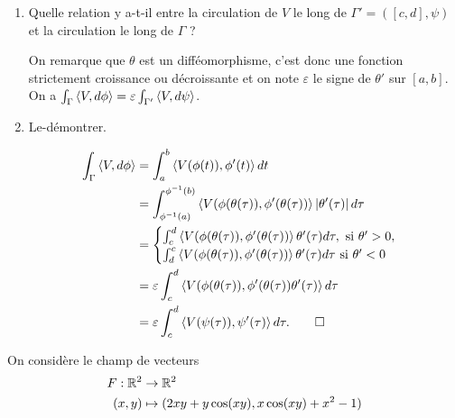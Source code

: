 \documentclass{article}
\begin{document}
		\begin{enumerate}[resume]
	\item Quelle relation y a-t-il entre la circulation de $V$ le long de $\Gamma'=([c,d],\psi)$ et la circulation le long de $\Gamma$ ? 
		
	\medskip

 On remarque que $\theta$ est un difféomorphisme, c'est donc une fonction strictement croissance ou décroissante et on note  $\varepsilon$ le signe de $\theta'$ sur $[a,b]$. On a $\int_{\Gamma} \left\langle V,d\phi\right\rangle = \varepsilon \int_{\Gamma'} \left\langle V,d\psi\right\rangle $. 
	
	\medskip

	\item Le-d\'emontrer.


		\begin{align*}
			\int_{\Gamma} \prs{V,d\phi}  & = \int_a^b \prs{V(\phi(t)), \phi'(t) } dt\\
			& = \int^{\phi^{-1}(b)}_{\phi^{-1}(a)}  \prs{V( \phi(\theta(\tau)) , \phi'(\theta(\tau)) } \abs{\theta'(\tau)} d\tau \\
			& = \begin{cases}
				\int_{c}^{d}  \prs{V( \phi(\theta(\tau)) , \phi'(\theta(\tau)) } \theta'(\tau) d\tau, \text{ si } \theta'>0,  \\
					 \int_{d}^{c}  \prs{V( \phi(\theta(\tau)) , \phi'(\theta(\tau)) } \theta'(\tau) d\tau  \text{ si } \theta' <0
			\end{cases} \\ 
			& = \varepsilon \int_c^d \prs{V( \phi(\theta(\tau)) , \phi'(\theta(\tau))\theta'(\tau) } d\tau \\ 
			& = \varepsilon\int_c^d \prs{V( \psi(\tau)) , \psi'(\tau)} d\tau . \hfill \qed
		\end{align*}
\end{enumerate}

\bigskip


\exo{} On considère le champ de vecteurs 
\begin{align*}
	F: \mathbb{R}^2 & \to \mathbb{R}^2 \\
	(x,y) & \mapsto (2xy+y\cos(xy), x\cos(xy) +x^2-1)
\end{align*}
\end{document}
